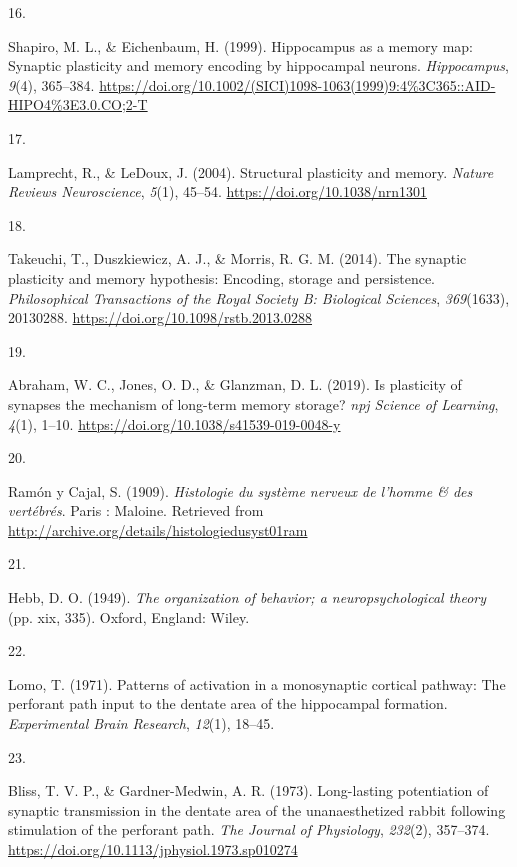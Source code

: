 \documentclass[
  11pt,
  letterpaper,
]{scrreprt}
\newlength{\cslhangindent}
\newlength{\csllabelwidth}
\newenvironment{CSLReferences}[2] %
 {\begin{list}{}{%
  \setlength{\itemindent}{0pt}
  \setlength{\leftmargin}{0pt}
  \setlength{\parsep}{0pt}
  \ifodd #1
   \setlength{\leftmargin}{\cslhangindent}
   \setlength{\itemindent}{-1\cslhangindent}
  \fi
  \setlength{\itemsep}{#2\baselineskip}}}
 {\end{list}}
\newcommand{\CSLLeftMargin}[1]{\parbox[t]{\csllabelwidth}{\strut#1\strut}}
\newcommand{\CSLRightInline}[1]{\parbox[t]{\linewidth - \csllabelwidth}{\strut#1\strut}}
\begin{document}
\begin{CSLReferences}{0}{0}
\CSLLeftMargin{16. }%
\CSLRightInline{Shapiro, M. L., \& Eichenbaum, H. (1999). Hippocampus as
a memory map: {Synaptic} plasticity and memory encoding by hippocampal
neurons. \emph{Hippocampus}, \emph{9}(4), 365--384.
\url{https://doi.org/10.1002/(SICI)1098-1063(1999)9:4\%3C365::AID-HIPO4\%3E3.0.CO;2-T}}

\CSLLeftMargin{17. }%
\CSLRightInline{Lamprecht, R., \& LeDoux, J. (2004). Structural
plasticity and memory. \emph{Nature Reviews Neuroscience}, \emph{5}(1),
45--54. \url{https://doi.org/10.1038/nrn1301}}

\CSLLeftMargin{18. }%
\CSLRightInline{Takeuchi, T., Duszkiewicz, A. J., \& Morris, R. G. M.
(2014). The synaptic plasticity and memory hypothesis: Encoding, storage
and persistence. \emph{Philosophical Transactions of the Royal Society
B: Biological Sciences}, \emph{369}(1633), 20130288.
\url{https://doi.org/10.1098/rstb.2013.0288}}

\CSLLeftMargin{19. }%
\CSLRightInline{Abraham, W. C., Jones, O. D., \& Glanzman, D. L. (2019).
Is plasticity of synapses the mechanism of long-term memory storage?
\emph{npj Science of Learning}, \emph{4}(1), 1--10.
\url{https://doi.org/10.1038/s41539-019-0048-y}}

\CSLLeftMargin{20. }%
\CSLRightInline{Ramón y Cajal, S. (1909). \emph{Histologie du système
nerveux de l'homme \& des vertébrés}. Paris : Maloine. Retrieved from
\url{http://archive.org/details/histologiedusyst01ram}}

\CSLLeftMargin{21. }%
\CSLRightInline{Hebb, D. O. (1949). \emph{The organization of behavior;
a neuropsychological theory} (pp. xix, 335). Oxford, England: Wiley.}

\CSLLeftMargin{22. }%
\CSLRightInline{Lomo, T. (1971). Patterns of activation in a
monosynaptic cortical pathway: The perforant path input to the dentate
area of the hippocampal formation. \emph{Experimental Brain Research},
\emph{12}(1), 18--45.}

\CSLLeftMargin{23. }%
\CSLRightInline{Bliss, T. V. P., \& Gardner-Medwin, A. R. (1973).
Long-lasting potentiation of synaptic transmission in the dentate area
of the unanaesthetized rabbit following stimulation of the perforant
path. \emph{The Journal of Physiology}, \emph{232}(2), 357--374.
\url{https://doi.org/10.1113/jphysiol.1973.sp010274}}


\end{CSLReferences}
\end{document}

